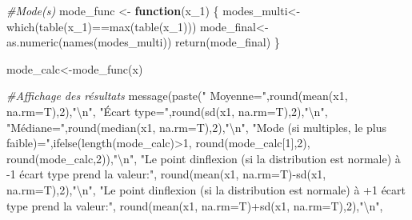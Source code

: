 \documentclass[
]{book}
\newenvironment{Shaded}{\begin{snugshade}}{\end{snugshade}}
\newcommand{\AttributeTok}[1]{\textcolor[rgb]{0.77,0.63,0.00}{#1}}
\newcommand{\CommentTok}[1]{\textcolor[rgb]{0.56,0.35,0.01}{\textit{#1}}}
\newcommand{\ControlFlowTok}[1]{\textcolor[rgb]{0.13,0.29,0.53}{\textbf{#1}}}
\newcommand{\DecValTok}[1]{\textcolor[rgb]{0.00,0.00,0.81}{#1}}
\newcommand{\FunctionTok}[1]{\textcolor[rgb]{0.00,0.00,0.00}{#1}}
\newcommand{\NormalTok}[1]{#1}
\newcommand{\OtherTok}[1]{\textcolor[rgb]{0.56,0.35,0.01}{#1}}
\newcommand{\SpecialCharTok}[1]{\textcolor[rgb]{0.00,0.00,0.00}{#1}}
\newcommand{\StringTok}[1]{\textcolor[rgb]{0.31,0.60,0.02}{#1}}
\begin{document}
\begin{Shaded}
\begin{Highlighting}[]
  \CommentTok{\#Mode(s)}
\NormalTok{  mode\_func }\OtherTok{\textless{}{-}} \ControlFlowTok{function}\NormalTok{(x\_1) \{                    }
\NormalTok{    modes\_multi}\OtherTok{\textless{}{-}}\FunctionTok{which}\NormalTok{(}\FunctionTok{table}\NormalTok{(x\_1)}\SpecialCharTok{==}\FunctionTok{max}\NormalTok{(}\FunctionTok{table}\NormalTok{(x\_1)))}
\NormalTok{    mode\_final}\OtherTok{\textless{}{-}}\FunctionTok{as.numeric}\NormalTok{(}\FunctionTok{names}\NormalTok{(modes\_multi))}
    \FunctionTok{return}\NormalTok{(mode\_final)}
\NormalTok{  \}}
  
\NormalTok{  mode\_calc}\OtherTok{\textless{}{-}}\FunctionTok{mode\_func}\NormalTok{(x)}
  
  \CommentTok{\#Affichage des résultats}
  \FunctionTok{message}\NormalTok{(}\FunctionTok{paste}\NormalTok{(}\StringTok{" Moyenne="}\NormalTok{,}\FunctionTok{round}\NormalTok{(}\FunctionTok{mean}\NormalTok{(x1, }\AttributeTok{na.rm=}\NormalTok{T),}\DecValTok{2}\NormalTok{),}\StringTok{"}\SpecialCharTok{\textbackslash{}n}\StringTok{"}\NormalTok{,}
                \StringTok{"Écart type="}\NormalTok{,}\FunctionTok{round}\NormalTok{(}\FunctionTok{sd}\NormalTok{(x1, }\AttributeTok{na.rm=}\NormalTok{T),}\DecValTok{2}\NormalTok{),}\StringTok{"}\SpecialCharTok{\textbackslash{}n}\StringTok{"}\NormalTok{,}
                \StringTok{"Médiane="}\NormalTok{,}\FunctionTok{round}\NormalTok{(}\FunctionTok{median}\NormalTok{(x1, }\AttributeTok{na.rm=}\NormalTok{T),}\DecValTok{2}\NormalTok{),}\StringTok{"}\SpecialCharTok{\textbackslash{}n}\StringTok{"}\NormalTok{,}
                \StringTok{"Mode (si multiples, le plus faible)="}\NormalTok{,}\FunctionTok{ifelse}\NormalTok{(}\FunctionTok{length}\NormalTok{(mode\_calc)}\SpecialCharTok{\textgreater{}}\DecValTok{1}\NormalTok{, }\FunctionTok{round}\NormalTok{(mode\_calc[}\DecValTok{1}\NormalTok{],}\DecValTok{2}\NormalTok{), }\FunctionTok{round}\NormalTok{(mode\_calc,}\DecValTok{2}\NormalTok{)),}\StringTok{"}\SpecialCharTok{\textbackslash{}n}\StringTok{"}\NormalTok{,}
                \StringTok{"Le point d\textquotesingle{}inflexion (si la distribution est normale) à {-}1 écart type prend la valeur:"}\NormalTok{, }\FunctionTok{round}\NormalTok{(}\FunctionTok{mean}\NormalTok{(x1, }\AttributeTok{na.rm=}\NormalTok{T)}\SpecialCharTok{{-}}\FunctionTok{sd}\NormalTok{(x1, }\AttributeTok{na.rm=}\NormalTok{T),}\DecValTok{2}\NormalTok{),}\StringTok{"}\SpecialCharTok{\textbackslash{}n}\StringTok{"}\NormalTok{,}
                \StringTok{"Le point d\textquotesingle{}inflexion (si la distribution est normale) à +1 écart type prend la valeur:"}\NormalTok{, }\FunctionTok{round}\NormalTok{(}\FunctionTok{mean}\NormalTok{(x1, }\AttributeTok{na.rm=}\NormalTok{T)}\SpecialCharTok{+}\FunctionTok{sd}\NormalTok{(x1, }\AttributeTok{na.rm=}\NormalTok{T),}\DecValTok{2}\NormalTok{),}\StringTok{"}\SpecialCharTok{\textbackslash{}n}\StringTok{"}\NormalTok{,}

\end{Highlighting}
\end{Shaded}
\end{document}
